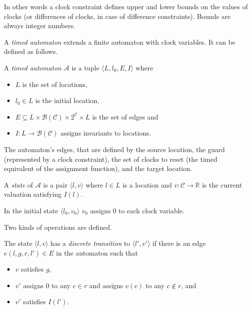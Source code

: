 In other words a clock constraint defines upper and lower bounds on the values of clocks (or differences of clocks, in case of difference constraints). Bounds are always integer numbers.

A \emph{timed automaton} extends a finite automaton with clock variables. It can be defined as follows.

\begin{dfn}
A \emph{timed automaton} $\mathcal{A}$ is a tuple $\langle L, l_0,
E, I\rangle$ where
\begin{itemize}
	\item $L$ is the set of locations,
	\item $l_0 \in L$ is the initial location,
	\item $E \subseteq L \times \mathcal{B}(\mathcal{C}) \times 2^\mathcal{C} \times L$ is the set of edges and
	\item $I: L \to \mathcal{B}(\mathcal{C})$ assigns invariants to locations. \cite{bengtsson2004timed}
\end{itemize}
\end{dfn}

The automaton's edges, that are defined by the source location, the guard (represented by a clock constraint), the set of clocks to reset (the timed equivalent of the assignment function), and the target location.

\begin{example}
\end{example}

\begin{dfn}
	A \emph{state} of $\mathcal{A}$ is a pair $\langle l,v \rangle$ where $l \in L$ is a
	location and $v:\mathcal{C} \to \mathds{R}$ is the current valuation satisfying $I(l)$.
\end{dfn}
 In the initial state $\langle l_0,v_0 \rangle$ $v_0$ assigns 0 to each clock variable.

Two kinds of operations are defined.

\begin{dfn}
	 The state $\langle l,v \rangle$ has a
	 \emph{discrete transition} to $\langle l',v' \rangle$  if there is an
	 edge $e(l,g,r,l') \in E$ in the automaton such that 
	 \begin{itemize}
	 	\item $v$ satisfies $g$, 
	 	\item $v'$ assigns 0 to any $c \in r$ and assigns $v(c)$ to any $c \not\in r$, and
	 	\item $v'$ satisfies $I(l')$. 
	 \end{itemize}
\end{dfn}

